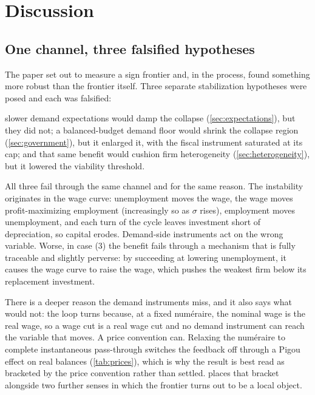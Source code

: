 
\section{Discussion}
\label{sec:discussion}

\subsection{One channel, three falsified hypotheses}

The paper set out to measure a sign frontier and, in the process, found
something more robust than the frontier itself. Three separate stabilization
hypotheses were posed and each was falsified:

slower demand expectations would damp the collapse
(\cref{sec:expectations}), but they did not; a balanced-budget demand floor
would shrink the collapse region (\cref{sec:government}), but it enlarged
it, with the fiscal instrument saturated at its cap; and that same benefit
would cushion firm heterogeneity (\cref{sec:heterogeneity}), but it
lowered the viability threshold.

All three fail through the same channel and for the same reason. The
instability originates in the wage curve: unemployment moves the wage, the
wage moves profit-maximizing employment (increasingly so as $\sigma$ rises),
employment moves unemployment, and each turn of the cycle leaves investment
short of depreciation, so capital erodes. Demand-side instruments act on the
wrong variable. Worse, in case (3) the benefit fails through a mechanism that
is fully traceable and slightly perverse: by succeeding at lowering
unemployment, it causes the wage curve to raise the wage, which pushes the
weakest firm below its replacement investment.

There is a deeper reason the demand instruments miss, and it also says what would
not: the loop turns because, at a fixed numéraire, the nominal wage is the
real wage, so a wage cut is a real wage cut and no demand instrument can reach the
variable that moves. A price convention can. Relaxing the numéraire to complete
instantaneous pass-through switches the feedback off through a Pigou effect on
real balances (\cref{tab:prices}), which is why the result is best read as
bracketed by the price convention rather than settled. 
places that bracket alongside two further senses in which the frontier turns out
to be a local object.


